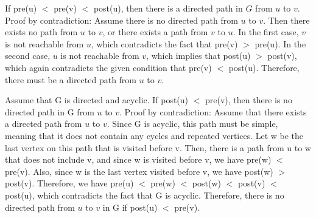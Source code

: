 \documentclass[12pt]{article}
\newenvironment{solution}{{\noindent\bf Solution:}}{\vspace{5mm}}
\begin{document}
\begin{solution}
      
      If pre(u) $<$ pre(v) $<$ post(u), then there is a directed path in $G$ from $u$ to $v$.
      Proof by contradiction:
      Assume there is no directed path from $u$ to $v$. Then there exists no path from $u$ to $v$, or there exists a path from $v$ to $u$. In the first case, $v$ is not reachable from $u$, which contradicts the fact that pre(v) $>$ pre(u). 
      In the second case, $u$ is not reachable from $v$, which implies that post(u) $>$ post(v), which again contradicts the given condition that pre(v) $<$ post(u). 
      Therefore, there must be a directed path from $u$ to $v$.

      Assume that G is directed and acyclic. If post(u) $<$ pre(v), then there is no directed path in G from $u$ to $v$.
      Proof by contradiction:
      Assume that there exists a directed path from $u$ to $v$. 
      Since G is acyclic, this path must be simple, meaning that it does not contain any cycles and repeated vertices. 
      Let w be the last vertex on this path that is visited before v. 
      Then, there is a path from u to w that does not include v, and since w is visited before v, we have pre(w) $<$ pre(v). 
      Also, since w is the last vertex visited before v, we have post(w) $>$ post(v). 
      Therefore, we have pre(u) $<$ pre(w) $<$ post(w) $<$ post(v) $<$ post(u), which contradicts the fact that G is acyclic. 
      Therefore, there is no directed path from $u$ to $v$ in G if post(u) $<$ pre(v).
\end{solution}
\end{document}
